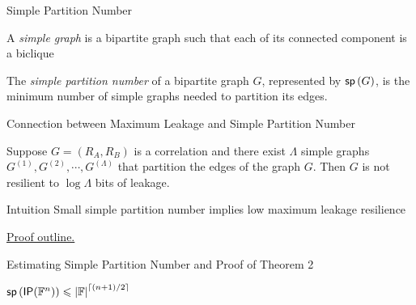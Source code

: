 \begin{frame}{Simple Partition Number}
	\begin{definition}
		A \textit{simple graph} is a bipartite graph such that each of its
		connected component is a biclique
	\end{definition}

	\begin{definition}
		The \textit{simple partition number} of a bipartite graph $G$, represented
		by $\sp G$, is the minimum number of simple graphs needed to
		partition its edges.
	\end{definition}
	
\end{frame}

\begin{frame}{Connection between Maximum Leakage and Simple Partition Number}
	\begin{lemma}
		Suppose $ G = (R_A, R_B) $ is a correlation and there exist $\Lambda$ simple graphs $ G^{(1)}, G^{(2)}, \cdots, G^{(\Lambda)} $ that partition the edges of the graph $ G $. 
		Then $ G $ is not resilient to $ \log \Lambda $ bits of leakage.
	\end{lemma}
	
	\begin{block}{Intuition}
		Small simple partition number implies low maximum leakage resilience
	\end{block}

	\underline{Proof outline.} 

\end{frame}

\begin{frame}{Estimating Simple Partition Number and Proof of Theorem 2}
	\begin{lemma}
		$ \sp{\IP ({\bbF^n})} \leq \abs{\bbF} ^{\ceil{(n+1)/2}}$
	\end{lemma}
\end{frame}

